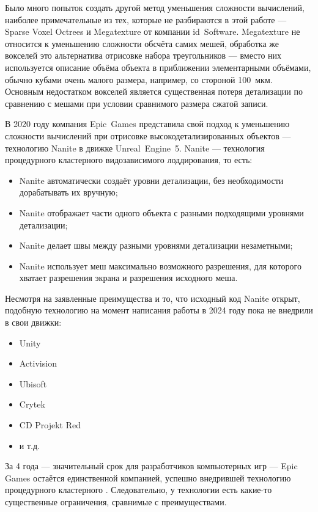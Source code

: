 Было много попыток создать другой метод уменьшения сложности вычислений, наиболее примечательные из тех, которые не разбираются в этой работе --- Sparse Voxel Octrees и Megatexture от компании id~Software.
Megatexture не относится к уменьшению сложности обсчёта самих мешей, обработка же вокселей это альтернатива отрисовке набора треугольников --- вместо них используется описание объёма объекта в приближении элементарными объёмами, обычно кубами очень малого размера, например, со стороной 100~мкм.
Основным недостатком вокселей является существенная потеря детализации по сравнению с мешами при условии сравнимого размера сжатой записи.

В 2020 году компания Epic~Games представила свой подход к уменьшению сложности вычислений при отрисовке высокодетализированных объектов --- технологию Nanite в движке Unreal~Engine~5.
Nanite --- технология процедурного кластерного видозависимого лоддирования, то есть:
\begin{itemize}
    \item Nanite автоматически создаёт уровни детализации, без необходимости дорабатывать их вручную;
    \item Nanite отображает части одного объекта с разными подходящими уровнями детализации;
    \item Nanite делает швы между разными уровнями детализации незаметными;
    \item Nanite использует меш максимально возможного разрешения, для которого хватает разрешения экрана и разрешения исходного меша.
\end{itemize}

Несмотря на заявленные преимущества и то, что исходный код Nanite открыт, подобную технологию на момент написания работы в 2024 году пока не внедрили в свои движки:
\begin{itemize}
    \item Unity
    \item Activision
    \item Ubisoft
    \item Crytek
    \item CD Projekt Red
    \item и т.д.
\end{itemize}
За 4 года --- значительный срок для разработчиков компьютерных игр --- Epic Games остаётся единственной компанией, успешно внедрившей технологию процедурного кластерного .
Следовательно, у технологии есть какие-то существенные ограничения, сравнимые с преимуществами.

